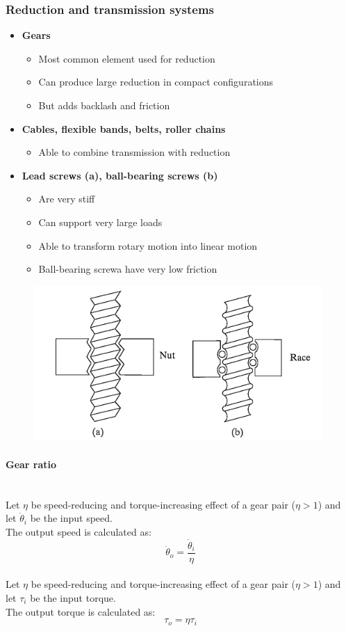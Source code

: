 \documentclass[10pt,a4paper]{article}
\begin{document}
\subsubsection{Reduction and transmission systems}
\begin{itemize}
	\item \textbf{Gears}
	\begin{itemize}
		\item Most common element used for reduction
		\item Can produce large reduction in compact configurations
		\item But adds backlash and friction
	\end{itemize}
	\item \textbf{Cables, flexible bands, belts, roller chains}
	\begin{itemize}
		\item Able to combine transmission with reduction
	\end{itemize}
	\item \textbf{Lead screws (a), ball-bearing screws (b)}
	\begin{itemize}
		\item Are very stiff
		\item Can support very large loads
		\item Able to transform rotary motion into linear motion
		\item Ball-bearing screwa have very low friction
	\end{itemize}
\end{itemize}

\begin{figure}[H]
	\includegraphics[width=0.5\columnwidth]{imgs/lead_screws.png}
\end{figure}

\paragraph{Gear ratio} ~\\
Let $\eta$ be speed-reducing and torque-increasing effect of a gear pair ($\eta > 1$) and \\
let $\dot \theta_i$ be the input speed. \\
The output speed is calculated as:
$$
	\dot \theta_o = \frac {\dot \theta_i} \eta 
$$
\\
Let $\eta$ be speed-reducing and torque-increasing effect of a gear pair ($\eta > 1$) and \\
let $\tau_i$ be the input torque. \\
The output torque is calculated as:
$$
	\tau_o = \eta\tau_i
$$
\end{document}
